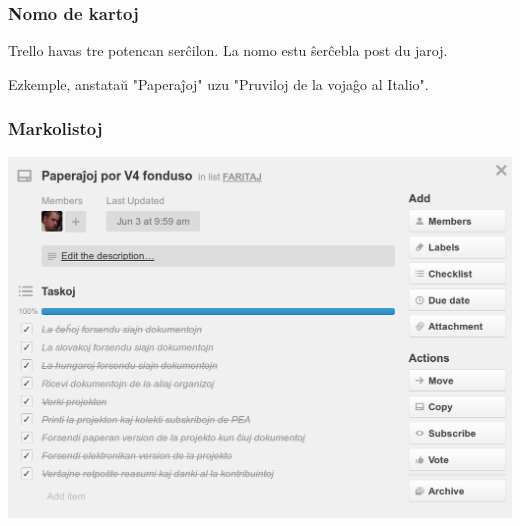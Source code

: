   \begin{frame}
    \frametitle{Nomo de kartoj}
		
	Trello havas tre potencan serĉilon. La nomo estu ŝerĉebla post du jaroj.
	
	Ezkemple, anstataŭ "Paperaĵoj" uzu "Pruviloj de la vojaĝo al Italio".
  \end{frame}



  \begin{frame}
    \frametitle{Markolistoj}
		
		\begin{center}
		\includegraphics[scale=0.222]{ekranoj/markolistoj}
		\end{center}
	
  \end{frame}



